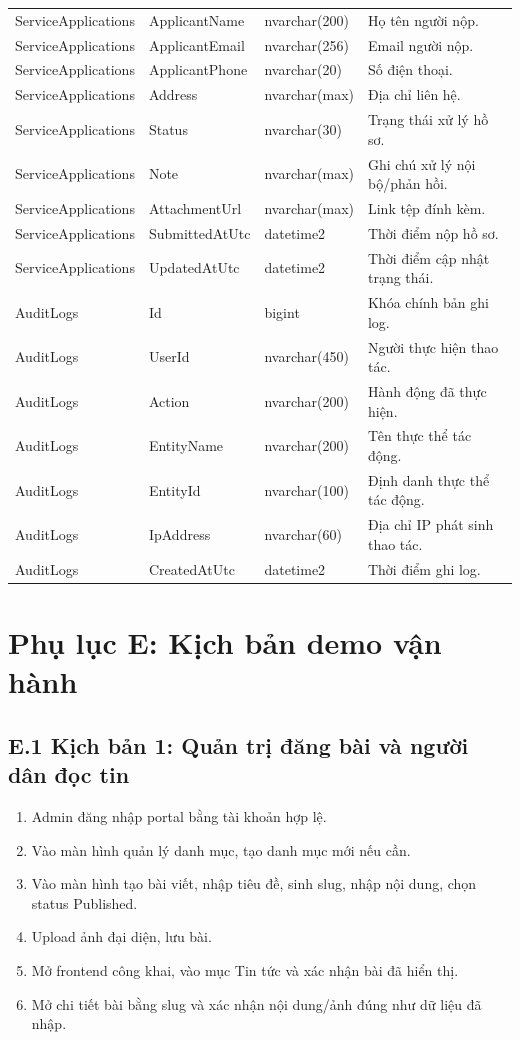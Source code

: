 \documentclass[12pt,a4paper]{article}
\begin{document}
\begin{longtable}{p{3.8cm}p{3.8cm}p{3.0cm}p{6.5cm}}
	ServiceApplications & ApplicantName & nvarchar(200) & Họ tên người nộp. \\
	ServiceApplications & ApplicantEmail & nvarchar(256) & Email người nộp. \\
	ServiceApplications & ApplicantPhone & nvarchar(20) & Số điện thoại. \\
	ServiceApplications & Address & nvarchar(max) & Địa chỉ liên hệ. \\
	ServiceApplications & Status & nvarchar(30) & Trạng thái xử lý hồ sơ. \\
	ServiceApplications & Note & nvarchar(max) & Ghi chú xử lý nội bộ/phản hồi. \\
	ServiceApplications & AttachmentUrl & nvarchar(max) & Link tệp đính kèm. \\
	ServiceApplications & SubmittedAtUtc & datetime2 & Thời điểm nộp hồ sơ. \\
	ServiceApplications & UpdatedAtUtc & datetime2 & Thời điểm cập nhật trạng thái. \\
	AuditLogs & Id & bigint & Khóa chính bản ghi log. \\
	AuditLogs & UserId & nvarchar(450) & Người thực hiện thao tác. \\
	AuditLogs & Action & nvarchar(200) & Hành động đã thực hiện. \\
	AuditLogs & EntityName & nvarchar(200) & Tên thực thể tác động. \\
	AuditLogs & EntityId & nvarchar(100) & Định danh thực thể tác động. \\
	AuditLogs & IpAddress & nvarchar(60) & Địa chỉ IP phát sinh thao tác. \\
	AuditLogs & CreatedAtUtc & datetime2 & Thời điểm ghi log. \\
	\bottomrule
\end{longtable}

\section*{Phụ lục E: Kịch bản demo vận hành}

\subsection*{E.1 Kịch bản 1: Quản trị đăng bài và người dân đọc tin}
\begin{enumerate}[leftmargin=1.1cm]
  \item Admin đăng nhập portal bằng tài khoản hợp lệ.
  \item Vào màn hình quản lý danh mục, tạo danh mục mới nếu cần.
  \item Vào màn hình tạo bài viết, nhập tiêu đề, sinh slug, nhập nội dung, chọn status Published.
  \item Upload ảnh đại diện, lưu bài.
  \item Mở frontend công khai, vào mục Tin tức và xác nhận bài đã hiển thị.
  \item Mở chi tiết bài bằng slug và xác nhận nội dung/ảnh đúng như dữ liệu đã nhập.
\end{enumerate}
\end{document}
